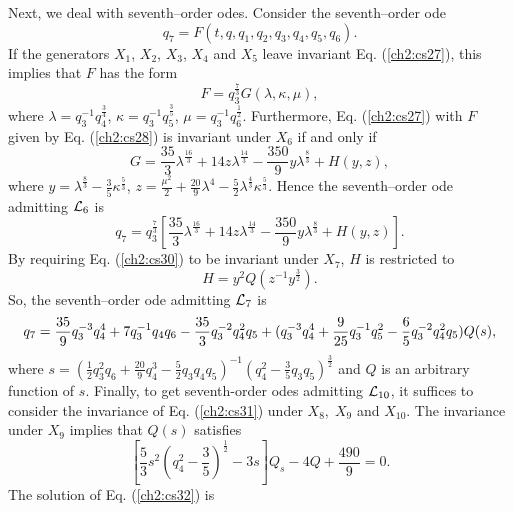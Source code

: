 Next, we deal with seventh--order odes. Consider the seventh--order ode
\begin{equation}
q_7=F(t,q,q_1,q_2,q_3,q_4,q_5,q_6).
\label{ch2:cs27}
\end{equation}
If the generators $X_1$, $X_2$, $X_3$, $X_4$ and $X_5$
leave invariant Eq. (\ref{ch2:cs27}), this implies
that $F$ has the form
\begin{equation}
F=q_3^{\frac{7}{3}}G(\lambda,\kappa,\mu),
\label{ch2:cs28}
\end{equation}
where $\lambda=q_3^{-1}q_4^{\frac{3}{4}}$,
$\kappa=q_3^{-1}q_5^{\frac{3}{5}}$, $\mu=q_3^{-1}q_6^{\frac{1}{2}}$.
Furthermore, Eq. (\ref{ch2:cs27}) with $F$ given by Eq. (\ref{ch2:cs28})
is invariant under $X_6$ if and only if
\begin{equation}
G=\frac{35}{3}\lambda^{\frac{16}{3}}+14z\lambda^{\frac{14}{3}}
-\frac{350}{9}y\lambda^{\frac{8}{3}}+H(y,z),
\label{ch2:cs29}
\end{equation}
where $y=\lambda^{\frac{8}{3}}-\frac{3}{5}\kappa^{\frac{5}{3}}$,
$z=\frac{\mu^2}{2}+\frac{20}{9}\lambda^4-\frac{5}{2}\lambda^{\frac{4}{3}}
\kappa^{\frac{5}{3}}$. Hence the seventh--order ode admitting ${\cal L}_6$ 
is
\begin{equation}
q_7=q_3^{\frac{7}{3}} \left [\frac{35}{3}\lambda^{\frac{16}{3}}+
14z\lambda^{\frac{14}{3}}-\frac{350}{9}y\lambda^{\frac{8}{3}}+H(y,z)\right ].
\label{ch2:cs30}
\end{equation}
By requiring Eq. (\ref{ch2:cs30}) to be invariant under $X_7$, $H$ is restricted
to
\[H=y^2Q(z^{-1}y^{\frac{3}{2}}).\]
So, the seventh--order ode admitting ${\cal L}_7$ is 
\begin{equation}
q_7=\frac{35}{9}q_3^{-3}q_4^4+7q_3^{-1}q_4q_6-\frac{35}{3}q_3^{-2}q_4^2q_5
\nonumber \\
+(q_3^{-3}q_4^4+\frac{9}{25}q_3^{-1}q_5^2-\frac{6}{5}q_3^{-2}q_4^2q_5)Q(s),
\label{ch2:cs31}
\end{equation}
where $s=(\frac{1}{2}q_3^2q_6+\frac{20}{9}q_4^3-\frac{5}{2}q_3q_4q_5)^{-1}
(q_4^2-\frac{3}{5}q_3q_5)^{\frac{3}{2}}$ and
$Q$ is an arbitrary function of $s$.
Finally, to get seventh-order odes admitting
${\cal L}_{10}$, it suffices to consider the invariance of
Eq. (\ref{ch2:cs31}) under $X_8,\;X_9$ and $X_{10}$. The invariance under
$X_9$ implies that $Q(s)$ satisfies
\begin{equation}
\left [\frac{5}{3}s^2(q_4^2-\frac{3}{5})^{\frac{1}{2}}-3s\right ]
Q_s-4Q+\frac{490}{9}=0.
\label{ch2:cs32}
\end{equation}
The solution of Eq. (\ref{ch2:cs32}) is 
